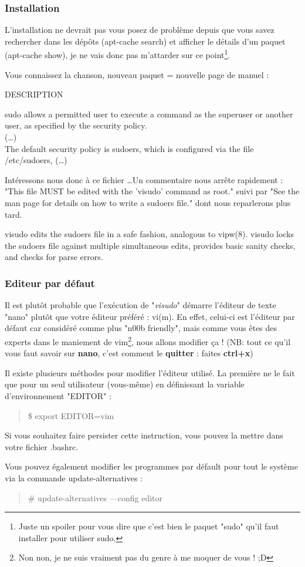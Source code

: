 \documentclass[a4paper,11pt]{article}
\newcommand{\commande}[1] {
    \begin{quote}
    \tt\raggedright #1 
    \end{quote}
}
\newcommand{\man}[2]{
    \begin{tcolorbox}[toprule=3mm,width=\textwidth,outer arc=0mm,colbacktitle=grayman,coltitle=black,colback={grayman},colframe={grayman},title={man : \tt #1}]
        \tt\raggedright #2
    \end{tcolorbox}
}
\newcommand{\mandesc}[1]{
    \begin{adjustwidth}{0.8cm}{}
        #1
    \end{adjustwidth}
}
\begin{document}
\subsubsection{Installation}
\par L'installation ne devrait pas vous posez de problème depuis que vous savez rechercher dans les dépôts (apt-cache search) et afficher le détails d'un paquet (apt-cache show), je ne vais donc pas m'attarder sur ce point\footnote{Juste un spoiler pour vous dire que c'est bien le paquet "sudo" qu'il faut installer pour utiliser sudo.}.
\par Vous connaissez la chanson, nouveau paquet = nouvelle page de manuel :
\man{sudo}{DESCRIPTION
\mandesc{sudo allows a permitted user to execute a command as the superuser or another user, as specified by the security policy.\\
(\dots)\\
The default security policy is sudoers, which is configured via the file /etc/sudoers, (\dots)}}
\par Intéressons nous donc à ce fichier \ldots  Un commentaire nous arrête rapidement : "This file MUST be edited with the 'visudo' command as root." suivi par "See the man page for details on how to write a sudoers file." dont nous reparlerons plus tard.
\man{visudo}{visudo edits the sudoers file in a safe fashion, analogous to vipw(8). visudo locks the sudoers file against multiple simultaneous edits, provides basic sanity checks, and checks for parse errors.}

\subsubsection{Editeur par défaut}
\par Il est plutôt probable que l'exécution de "\emph{visudo}" démarre l'éditeur de texte "nano" plutôt que votre éditeur préféré : vi(m). En effet, celui-ci est l'éditeur par défaut car considéré comme plus "n00b friendly", mais comme vous êtes des experts dans le maniement de vim\footnote{Non non, je ne suis vraiment pas du genre à me moquer de vous ! ;D}, nous allons modifier ça ! (NB: tout ce qu'il vous faut savoir sur \textbf{nano}, c'est comment le \textbf{quitter} : faites \textbf{ctrl+x})
\par Il existe plusieurs méthodes pour modifier l'éditeur utilisé. La première ne le fait que pour un seul utilisateur (vous-même) en définissant la variable d'environnement "EDITOR" :
\commande{\$ export EDITOR=vim}
\par Si vous souhaitez faire persister cette instruction, vous pouvez la mettre dans votre fichier .bashrc.
\par Vous pouvez également modifier les programmes par défault pour tout le système via la commande update-alternatives :
\commande{\# update-alternatives ---config editor}
\end{document}
